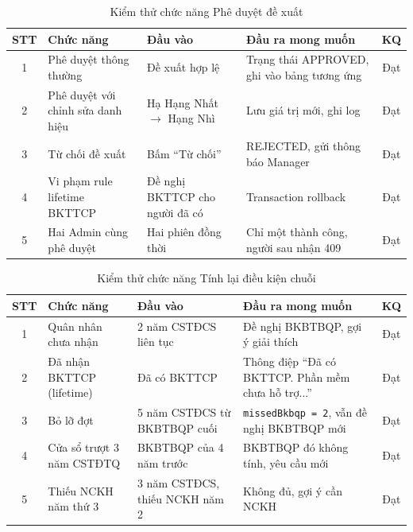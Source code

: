 \documentclass[../DoAn.tex]{subfiles}
\begin{document}
\begin{table}[H]
\centering
\caption{Kiểm thử chức năng Phê duyệt đề xuất}
\label{tab:kt-pheduyet}
\begin{tabular}{|c|p{4cm}|p{3.5cm}|p{4cm}|c|}
\hline
\textbf{STT} & \textbf{Chức năng} & \textbf{Đầu vào} & \textbf{Đầu ra mong muốn} & \textbf{KQ} \\ \hline
1 & Phê duyệt thông thường & Đề xuất hợp lệ & Trạng thái APPROVED, ghi vào bảng tương ứng & Đạt \\ \hline
2 & Phê duyệt với chỉnh sửa danh hiệu & Hạ Hạng Nhất $\rightarrow$ Hạng Nhì & Lưu giá trị mới, ghi log & Đạt \\ \hline
3 & Từ chối đề xuất & Bấm ``Từ chối'' & REJECTED, gửi thông báo Manager & Đạt \\ \hline
4 & Vi phạm rule lifetime BKTTCP & Đề nghị BKTTCP cho người đã có & Transaction rollback & Đạt \\ \hline
5 & Hai Admin cùng phê duyệt & Hai phiên đồng thời & Chỉ một thành công, người sau nhận 409 & Đạt \\ \hline
\end{tabular}
\end{table}

\begin{table}[H]
\centering
\caption{Kiểm thử chức năng Tính lại điều kiện chuỗi}
\label{tab:kt-tinhlai}
\begin{tabular}{|c|p{4cm}|p{3.5cm}|p{4cm}|c|}
\hline
\textbf{STT} & \textbf{Chức năng} & \textbf{Đầu vào} & \textbf{Đầu ra mong muốn} & \textbf{KQ} \\ \hline
1 & Quân nhân chưa nhận & 2 năm CSTĐCS liên tục & Đề nghị BKBTBQP, gợi ý giải thích & Đạt \\ \hline
2 & Đã nhận BKTTCP (lifetime) & Đã có BKTTCP & Thông điệp ``Đã có BKTTCP. Phần mềm chưa hỗ trợ...'' & Đạt \\ \hline
3 & Bỏ lỡ đợt & 5 năm CSTĐCS từ BKBTBQP cuối & \texttt{missedBkbqp = 2}, vẫn đề nghị BKBTBQP mới & Đạt \\ \hline
4 & Cửa sổ trượt 3 năm CSTĐTQ & BKBTBQP của 4 năm trước & BKBTBQP đó không tính, yêu cầu mới & Đạt \\ \hline
5 & Thiếu NCKH năm thứ 3 & 3 năm CSTĐCS, thiếu NCKH năm 2 & Không đủ, gợi ý cần NCKH & Đạt \\ \hline
\end{tabular}
\end{table}
\end{document}
